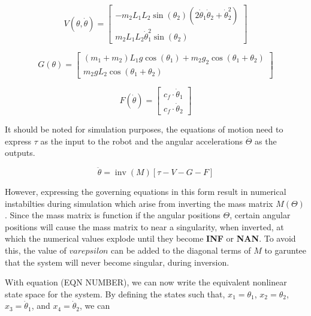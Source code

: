 \documentclass[journal]{IEEEtran}
\begin{document}
\begin{equation}
V(\theta, \dot{\theta})=\left[\begin{array}{c}
-m_{2} L_{1} L_{2} \sin \left(\theta_{2}\right)\left(2 \dot{\theta}_{1} \dot{\theta}_{2}+\dot{\theta}_{2}^{2}\right) \\
m_{2} L_{1} L_{2} \dot{\theta}_{1}^{2} \sin \left(\theta_{2}\right)
\end{array}\right]
\end{equation}


\begin{equation}
G(\theta)=\left[\begin{array}{c}
\left(m_{1}+m_{2}\right) L_{1} g \cos \left(\theta_{1}\right)+m_{2} g_{2} \cos \left(\theta_{1}+\theta_{2}\right) \\
m_{2} g L_{2} \cos \left(\theta_{1}+\theta_{2}\right)
\end{array}\right]
\end{equation}


\begin{equation}
F(\dot{\theta})=\left[\begin{array}{c}
c_{f} \cdot \dot{\theta}_{1} \\
c_{f} \cdot \dot{\theta}_{2}
\end{array}\right]
\end{equation}


It should be noted for simulation purposes, the equations of motion need to express $\tau$ as the input to the robot and the angular accelerations $\ddot{\Theta}$ as the outputs.

\begin{equation}
\ddot{\theta}=\operatorname{inv}(M)[\tau-V-G-F]
\end{equation}

However, expressing the governing equations in this form result in numerical instabilties during simulation which arise from inverting the mass matrix $M(\Theta)$. Since the mass matrix is function if the angular positions $\Theta$, certain angular positions will cause the mass matrix to near a singularity, when inverted, at which the numerical values explode until they become \textbf{INF} or \textbf{NAN}. To avoid this, the value of $varepsilon$ can be added to the diagonal terms of $M$ to garuntee that the system will never become singular, during inversion.


With equation (EQN NUMBER), we can now write the equivalent nonlinear state space for the system. By defining the states such that, $x_{1}=\theta_{1}$, $x_{2}=\theta_{2}$, $x_{3}=\dot{\theta}_{1}$, and $x_{4}=\dot{\theta}_{2}$, we can
\end{document}
